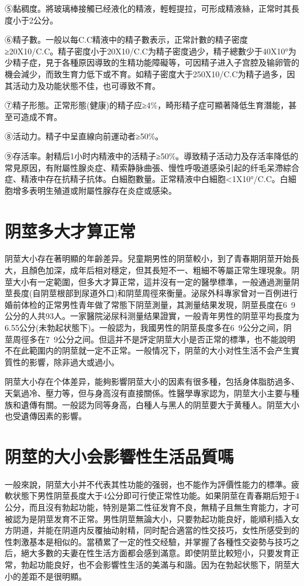 \documentclass[12pt,UTF8]{ctexbook}
\begin{document}
⑤黏稠度。將玻璃棒接觸已经液化的精液，輕輕提拉，可形成精液絲，正常时其長度小于2公分。

⑥精子數。一般以每C.C精液中的精子數表示，正常計數的精子密度≥20X10/C.C。精子密度小于20X10/C.C为精子密度過少，精子總數少于40X10°为少精子症，見于各種原因導致的生精功能障礙等，可因精子进入子宫腔及输卵管的機会減少，而致生育力低下或不育。如精子密度大于250X10/C.C为精子過多，因其活动力及功能状態不佳，也可導致不育。

⑦精子形態。正常形態(健康)的精子应≥4\%，畸形精子症可顯著降低生育潛能，甚至可造成不育。

⑧活动力。精子中呈直線向前運动者≥50\%。

⑨存活率。射精后1小时内精液中的活精子≥50\%。導致精子活动力及存活率降低的常見原因，有附屬性腺炎症、精索静脉曲張、慢性呼吸道感染引起的纤毛呆滯綜合症、精液中存在抗精子抗体。白細胞數量。正常精液中白細胞<1X10°/C.C。白細胞增多表明生殖道或附屬性腺存在炎症或感染。

\section{阴莖多大才算正常}

阴莖大小存在著明顯的年齡差异。兒童期男性的阴莖較小，到了青春期阴莖开始長大，且顏色加深，成年后相对穩定，但其長短不一、粗細不等屬正常生理現象。阴莖大小有一定範圍，但多大才算正常，這并沒有一定的醫學標準，一般通過測量阴莖長度(自阴莖根部到尿道外口)和阴莖周徑來衡量。泌尿外科專家曾对一百例进行婚前体检的正常男性青年做了常態下阴莖測量，其測量结果发現，阴莖長度在6~9公分的人共93人。一家醫院泌尿科测量结果證實，一般青年男性的阴莖平均長度为6.55公分(未勃起状態下)。一般認为，我國男性的阴莖長度多在6~9公分之间，阴莖周徑多在7~9公分之间。但這并不是評定阴莖大小是否正常的標準，也不能說明不在此範圍内的阴莖就一定不正常。一般情况下，阴莖的大小对性生活不会产生實質性的影響，除非過大或過小。

阴莖大小存在个体差异，能夠影響阴莖大小的因素有很多種，包括身体脂肪過多、天氣過冷、壓力等，但与身高沒有直接關係。性醫學專家認为，阴莖大小主要与種族和遺傳有關。一般認为同等身高，白種人与黑人的阴莖要大于黄種人。阴莖大小也受遺傳因素的影響。

\section{阴莖的大小会影響性生活品質嗎}

一般來說，阴莖大小并不代表其性功能的强弱，也不能作为評價性能力的標準。疲軟状態下男性阴莖長度大于4公分即可行使正常性功能。如果阴莖在青春期后短于4公分，而且沒有勃起功能，特別是第二性征发育不良，無精子且無生育能力，才可被認为是阴莖发育不正常。男性阴莖無論大小，只要勃起功能良好，能順利插入女方阴道，并能在阴道内反覆抽动射精，同时配合適當的性交技巧，女性所感受到的性刺激基本是相似的。當積累了一定的性交经驗，并掌握了各種性交姿勢与技巧之后，絕大多數的夫妻在性生活方面都会感到滿意。即使阴莖比較短小，只要发育正常，勃起功能良好，也不会影響性生活的美滿与和諧。因为在勃起状態下，阴莖大小的差距不是很明顯。
\end{document}
